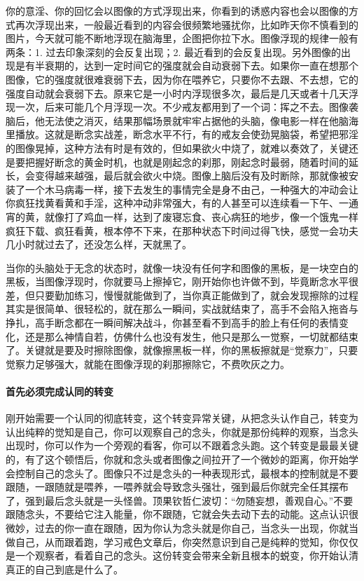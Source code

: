 你的意淫、你的回忆会以图像的方式浮现出来，你看到的诱惑内容也会以图像的方式再次浮现出来，一般最近看到的内容会很频繁地骚扰你，比如昨天你不慎看到的图片，今天就可能不断地浮现在脑海里，企图把你拉下水。图像浮现的规律一般有两条：1. 过去印象深刻的会反复出现；2. 最近看到的会反复出现。另外图像的出现是有半衰期的，达到一定时间它的强度就会自动衰弱下去。如果你一直在想那个图像，它的强度就很难衰弱下去，因为你在喂养它，只要你不去跟、不去想，它的强度自动就会衰弱下去。原来它是一小时内浮现很多次，最后是几天或者十几天浮现一次，后来可能几个月浮现一次。不少戒友都用到了一个词：挥之不去。图像袭脑后，他无法使之消灭，结果那幅场景就牢牢占据他的头脑，像电影一样在他脑海里播放。这就是断念实战差，断念水平不行，有的戒友会使劲晃脑袋，希望把邪淫的图像晃掉，这种方法有时是有效的，但如果欲火中烧了，就难以奏效了，关键还是要把握好断念的黄金时机，也就是刚起念的刹那，刚起念时最弱，随着时间的延长，会变得越来越强，最后就会欲火中烧。图像上脑后没有及时断除，那就像被安装了一个木马病毒一样，接下去发生的事情完全是身不由己，一种强大的冲动会让你疯狂找黄看黄和手淫，这种冲动非常强大，有的人甚至可以连续看一下午、一通宵的黄，就像打了鸡血一样，达到了废寝忘食、丧心病狂的地步，像一个饿鬼一样疯狂下载、疯狂看黄，根本停不下来，在那种状态下时间过得飞快，感觉一会功夫几小时就过去了，还没怎么样，天就黑了。

当你的头脑处于无念的状态时，就像一块没有任何字和图像的黑板，是一块空白的黑板，当图像浮现时，你就要马上擦掉它，刚开始你也许做不到，毕竟断念水平很差，但只要勤加练习，慢慢就能做到了，当你真正能做到了，就会发现擦除的过程其实是很简单、很轻松的，就在那么一瞬间，实战就结束了，高手不会陷入拖沓与挣扎，高手断念都在一瞬间解决战斗，你甚至看不到高手的脸上有任何的表情变化，还是那么神情自若，仿佛什么也没有发生，他只是那么一觉察，一切就都结束了。关键就是要及时擦除图像，就像擦黑板一样，你的黑板擦就是“觉察力”，只要觉察力足够强大，就能在图像浮现的刹那擦除它，不费吹灰之力。

\paragraph{首先必须完成认同的转变}

刚开始需要一个认同的彻底转变，这个转变异常关键，从把念头认作自己，转变为认出纯粹的觉知是自己，你可以观察自己的念头，你就是那份纯粹的观察，当念头出现时，你可以作为一个旁观的看客，你可以不跟着念头跑。这个转变是最最关键的，有了这个顿悟后，你就和念头或者图像之间拉开了一个微妙的距离，你开始学会控制自己的念头了。图像只不过是念头的一种表现形式，最根本的控制就是不要跟随，一跟随就是喂养，一喂养就会导致念头强壮，强到最后你就完全任其摆布了，强到最后念头就是一头怪兽。顶果钦哲仁波切：“勿随妄想，善观自心。”不要跟随念头，不要给它注入能量，你不跟随，它就会失去动下去的动能。这点认识很微妙，过去的你一直在跟随，因为你认为念头就是你自己，当念头一出现，你就当做自己，从而跟着跑，学习戒色文章后，你突然意识到自己是纯粹的觉知，你仅仅是一个观察者，看着自己的念头。这份转变会带来全新且根本的蜕变，你开始认清真正的自己到底是什么了。

